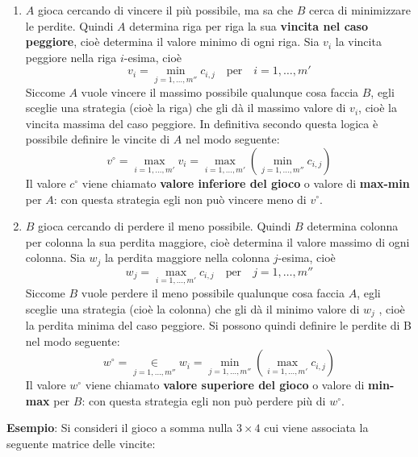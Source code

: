 \documentclass[a4paper]{extarticle}
\begin{document}
\vspace{1em}
\begin{enumerate}
    \item $A$ gioca cercando di vincere il più possibile, ma sa che $B$ cerca di minimizzare le perdite. Quindi $A$ determina riga per riga la sua \textbf{vincita nel caso peggiore}, cioè determina il valore minimo di ogni riga. Sia $v_i$ la vincita peggiore nella riga $i$-esima, cioè
    \[v_i = \underset{j={1,\dots,m''}}{\min} c_{i,j} \hspace{1em} \text{per} \hspace{1em} i=1,\dots,m'\]
    Siccome $A$ vuole vincere il massimo possibile qualunque cosa faccia $B$, egli sceglie una strategia (cioè la riga) che gli dà il massimo valore di $v_i$, cioè la vincita massima del caso peggiore. In definitiva secondo questa logica è possibile definire le vincite di $A$ nel modo seguente:
    \[v^\circ=\underset{i={1,\dots,m'}}{\max} v_{i} = \underset{i={1,\dots,m'}}{\max} \left(\underset{j={1,\dots,m''}}{\min} c_{i,j}\right)\]
    Il valore $c^\circ$ viene chiamato \textbf{valore inferiore del gioco} o valore di \textbf{max-min} per $A$: con questa strategia egli non può vincere meno di $v^\circ$.

    \item $B$ gioca cercando di perdere il meno possibile. Quindi $B$ determina colonna per colonna la sua perdita maggiore, cioè determina il valore massimo di ogni colonna. Sia $w_j$ la perdita maggiore nella colonna $j$-esima, cioè
    \[w_j = \underset{i={1,\dots,m'}}{\max} c_{i,j} \hspace{1em} \text{per} \hspace{1em} j=1,\dots,m''\]
    Siccome $B$ vuole perdere il meno possibile qualunque cosa faccia $A$, egli sceglie una strategia (cioè la colonna) che gli dà il minimo valore di $w_j$ , cioè la perdita minima del caso peggiore. Si possono quindi definire le perdite di B nel modo seguente:
    \[w^\circ=\underset{j={1,\dots,m''}}{\in} w_{i} = \underset{j={1,\dots,m''}}{\min} \left(\underset{i={1,\dots,m'}}{\max} c_{i,j}\right)\]
    Il valore $w^\circ$ viene chiamato \textbf{valore superiore del gioco} o valore di \textbf{min-max} per $B$: con questa strategia egli non può perdere più di $w^\circ$.
\end{enumerate}

\vspace{1em}
\noindent
\textbf{Esempio}: Si consideri il gioco a somma nulla $3 \times 4$ cui viene associata la seguente matrice delle vincite:
\end{document}
